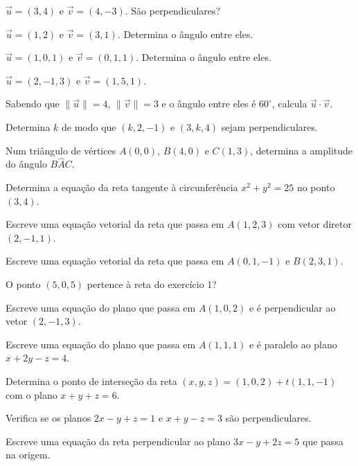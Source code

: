 \documentclass[12pt]{article}
\begin{document}
\begin{exercicios}
  \item $\vec u = (3, 4)$ e $\vec v = (4, -3)$. São perpendiculares?
  \item $\vec u = (1, 2)$ e $\vec v = (3, 1)$. Determina o ângulo entre eles.
  \item $\vec u = (1, 0, 1)$ e $\vec v = (0, 1, 1)$. Determina o ângulo entre eles.
  \item $\vec u = (2, -1, 3)$ e $\vec v = (1, 5, 1)$.
  \item Sabendo que $\|\vec u\| = 4$, $\|\vec v\| = 3$ e o ângulo entre eles é $60^\circ$, calcula $\vec u \cdot \vec v$.
  \item Determina $k$ de modo que $(k, 2, -1)$ e $(3, k, 4)$ sejam perpendiculares.
  \item Num triângulo de vértices $A(0,0)$, $B(4,0)$ e $C(1,3)$, determina a amplitude do ângulo $B\hat{A}C$.
  \item Determina a equação da reta tangente à circunferência $x^2 + y^2 = 25$ no ponto $(3, 4)$.
\end{exercicios}

\begin{exercicios}
  \item Escreve uma equação vetorial da reta que passa em $A(1, 2, 3)$ com vetor diretor $(2, -1, 1)$.
  \item Escreve uma equação vetorial da reta que passa em $A(0, 1, -1)$ e $B(2, 3, 1)$.
  \item O ponto $(5, 0, 5)$ pertence à reta do exercício 1?
  \item Escreve uma equação do plano que passa em $A(1, 0, 2)$ e é perpendicular ao vetor $(2, -1, 3)$.
  \item Escreve uma equação do plano que passa em $A(1, 1, 1)$ e é paralelo ao plano $x + 2y - z = 4$.
  \item Determina o ponto de interseção da reta $(x, y, z) = (1, 0, 2) + t(1, 1, -1)$ com o plano $x + y + z = 6$.
  \item Verifica se os planos $2x - y + z = 1$ e $x + y - z = 3$ são perpendiculares.
  \item Escreve uma equação da reta perpendicular ao plano $3x - y + 2z = 5$ que passa na origem.
\end{exercicios}
\end{document}
